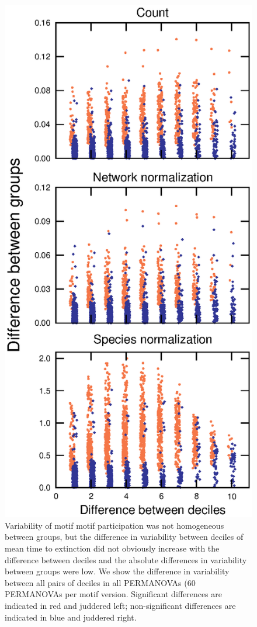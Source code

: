 \documentclass[12pt]{article}
\begin{document}
\begin{spacing}{2.0}
        \begin{figure}[h!]
            \centering
            \includegraphics[height=.75\textheight]{figures/Tukey_differences.eps}
            \caption{Variability of motif motif participation was not homogeneous between groups, but the difference in variability between deciles of mean time to extinction did not obviously increase with the difference between deciles and the absolute differences in variability between groups were low. We show the difference in variability between all pairs of deciles in all PERMANOVAs (60 PERMANOVAs per motif version. Significant differences are indicated in red and juddered left; non-significant differences are indicated in blue and juddered right.}
            \label{fig:betadisper_Tukey}
        \end{figure}


\end{spacing}
\end{document}

